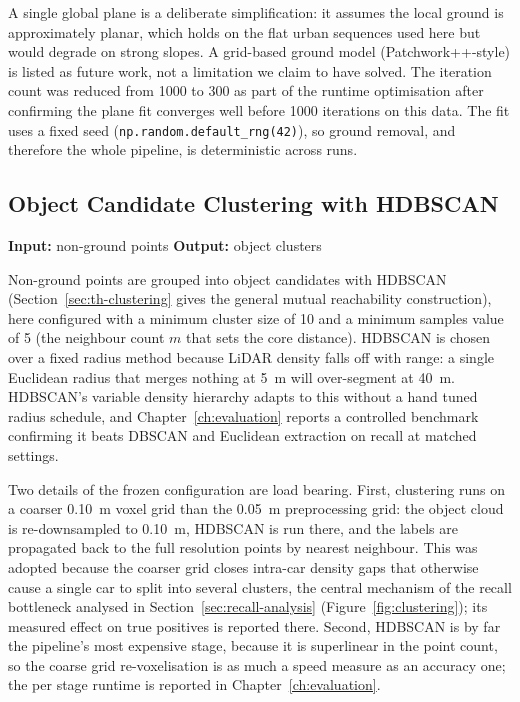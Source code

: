 \documentclass[a4paper,12pt]{report}
\begin{document}
A single global plane is a deliberate simplification: it assumes the local ground
is approximately planar, which holds on the flat urban sequences used here but
would degrade on strong slopes. A grid-based ground model (Patchwork++-style) is
listed as future work, not a limitation we claim to have solved. The iteration
count was reduced from \num{1000} to \num{300} as part of the runtime optimisation after
confirming the plane fit converges well before \num{1000} iterations on this
data. The fit uses a fixed seed (\texttt{np.random.default\_rng(42)}), so ground
removal, and therefore the whole pipeline, is deterministic across runs.

\subsection{Object Candidate Clustering with HDBSCAN}
\label{sec:pipeline-cluster}

\noindent \textbf{Input:} non-ground points \quad \textbar \quad \textbf{Output:} object clusters \vspace{0.5em}

Non-ground points are grouped into object candidates with HDBSCAN
(Section~\ref{sec:th-clustering} gives the general mutual reachability construction), here
configured with a minimum cluster size of \num{10} and a minimum samples value of \num{5}
(the neighbour count $m$ that sets the core distance). HDBSCAN is chosen over a fixed radius method
because LiDAR density falls off with range: a single Euclidean radius that merges
nothing at \SI{5}{\meter} will over-segment at \SI{40}{\meter}. HDBSCAN's
variable density hierarchy adapts to this without a hand tuned radius schedule,
and Chapter~\ref{ch:evaluation} reports a controlled benchmark confirming it beats
DBSCAN and Euclidean extraction on recall at matched settings.

Two details of the frozen configuration are load bearing. First, clustering runs
on a coarser \SI{0.10}{\meter} voxel grid than the \SI{0.05}{\meter}
preprocessing grid: the object cloud is re-downsampled to \SI{0.10}{\meter},
HDBSCAN is run there, and the labels are propagated back to the full resolution
points by nearest neighbour. This was adopted because the coarser
grid closes intra-car density gaps that otherwise cause a single car to split
into several clusters, the central mechanism of the recall bottleneck analysed
in Section~\ref{sec:recall-analysis} (Figure~\ref{fig:clustering}); its measured effect on
true positives is reported there. Second, HDBSCAN is by far the pipeline's most expensive
stage, because it is superlinear in the point count, so the coarse grid re-voxelisation is
as much a speed measure as an accuracy one; the per stage runtime is reported in
Chapter~\ref{ch:evaluation}.
\end{document}
